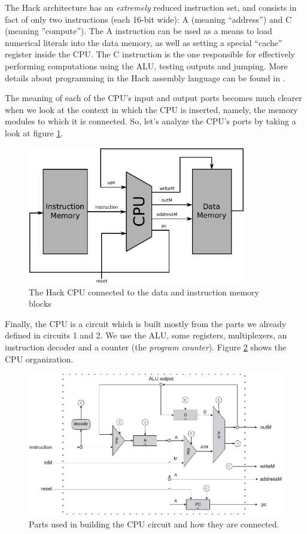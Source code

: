         The Hack architecture has an \emph{extremely} reduced instruction set, and consists in fact
        of only two instructions (each 16-bit wide): A (meaning ``address'') and C (meaning
        ''compute''). The A instruction can be used as a means to load numerical literals into the
        data memory, as well as setting a special ``cache'' register inside the CPU. The C
        instruction is the one responsible for effectively performing computations using the ALU,
        testing outputs and jumping. More details about programming in the Hack assembly language
        can be found in \cite{nand2tetris-chapter-assembly}.

        The meaning of each of the CPU's input and output ports becomes much clearer when we look at
        the context in which the CPU is inserted, namely, the memory modules to which it is
        connected. So, let's analyze the CPU's ports by taking a look at figure
        \ref{fig:cpu-memory}.

        \begin{figure}[h!]
            \centerline{\includegraphics[width=0.85\textwidth]{imgs/cpu-memory.pdf}}
            \caption{The Hack CPU connected to the data and instruction memory blocks
                \label{fig:cpu-memory}}
        \end{figure}

        Finally, the CPU is a circuit which is built mostly from the parts we already defined in
        circuits 1 and 2. We use the ALU, some registers, multiplexers, an instruction decoder and a
        counter (the \emph{program counter}). Figure \ref{fig:cpu-parts} shows the CPU organization.

        \begin{figure}[h!]
            \centerline{\includegraphics[width=1.0\textwidth]{imgs/cpu-parts.pdf}}
            \caption{Parts used in building the CPU circuit and how they are connected.
                \label{fig:cpu-parts}}
        \end{figure}
